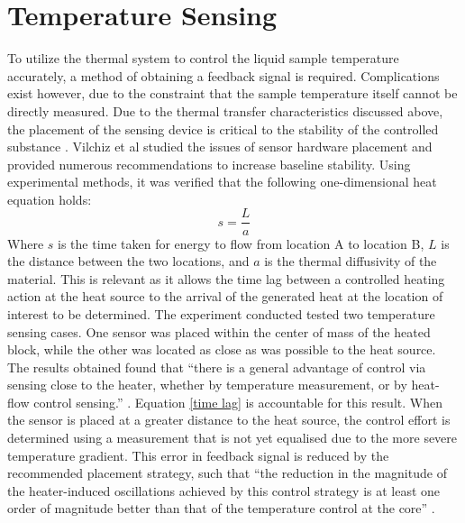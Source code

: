 \section{Temperature Sensing}
To utilize the thermal system to control the liquid sample temperature accurately, a method of obtaining a feedback signal is required. Complications exist however, due to the constraint that the sample temperature itself cannot be directly measured. Due to the thermal transfer characteristics discussed above, the placement of the sensing device is critical to the stability of the controlled substance \cite{20130415930883}. Vilchiz et al studied the issues of sensor hardware placement and provided numerous recommendations to increase baseline stability. Using experimental methods, it was verified that the following one-dimensional heat equation holds:
\begin{equation}\label{time lag}
s=\frac{L}{a}
\end{equation}
Where $s$ is the time taken for energy to flow from location A to location B, $L$ is the distance between the two locations, and $a$ is the thermal diffusivity of the material. This is relevant as it allows the time lag between a controlled heating action at the heat source to the arrival of the generated heat at the location of interest to be determined. The experiment conducted tested two temperature sensing cases. One sensor was placed within the center of mass of the heated block, while the other was located as close as was possible to the heat source. The results obtained found that ``there is a general advantage of control via sensing close to the heater, whether by temperature measurement, or by heat-flow control sensing.'' \cite{20130415930883}. Equation \ref{time lag} is accountable for this result. When the sensor is placed at a greater distance to the heat source, the control effort is determined using a measurement that is not yet equalised due to the more severe temperature gradient. This error in feedback signal is reduced by the recommended placement strategy, such that ``the reduction in the magnitude of the heater-induced oscillations achieved by this control strategy is at least one order of magnitude better than that of the temperature control at the core'' \cite{20130415930883}.\\

